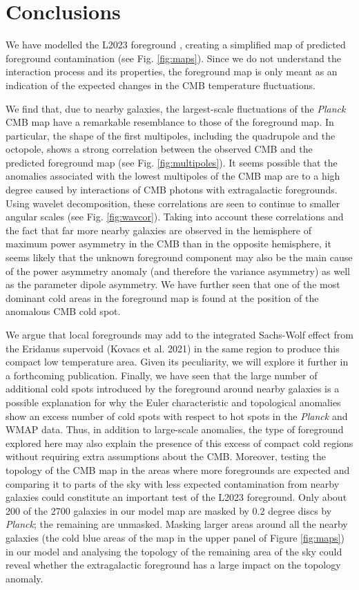 \documentclass{aa}
\begin{document}
\section{Conclusions}

We have modelled the L2023 foreground \citep{luparello}, creating a simplified map of predicted foreground contamination (see Fig. \ref{fig:maps}). Since we do not understand the interaction process and its properties, the foreground map is only meant as an indication of the expected changes in the CMB temperature fluctuations.

We find that, due to nearby galaxies, the largest-scale fluctuations of the \textit{Planck} CMB map have a remarkable resemblance to those of the foreground map. In particular, the shape of the first multipoles, including the quadrupole and the octopole, shows a strong correlation between the observed CMB and the predicted foreground map (see Fig. \ref{fig:multipoles}). It seems possible that the anomalies associated with the lowest multipoles of the CMB map are to a high degree caused by interactions of CMB photons with extragalactic foregrounds. Using wavelet decomposition, these correlations are seen to continue to smaller angular scales (see Fig. \ref{fig:wavcor}). Taking into account these correlations and the fact that far more nearby galaxies are observed in the hemisphere of maximum power asymmetry in the CMB than in the opposite hemisphere, it seems likely that the unknown foreground component may also be the main cause of the power asymmetry anomaly (and therefore the variance asymmetry) as well as the parameter dipole asymmetry. We have further seen that one of the most dominant cold areas in the foreground map is found at the position of the anomalous CMB cold spot.

We argue that local foregrounds may add to the integrated Sachs-Wolf effect from the Eridanus supervoid (Kovacs et al. 2021) in the same region to produce this compact low temperature area. Given its peculiarity, we will explore it further in a forthcoming publication. Finally, we have seen that the large number of additional cold spots introduced by the foreground around nearby galaxies is a possible explanation for why the Euler characteristic and topological anomalies show an excess number of cold spots with respect to hot spots in the \textit{Planck} and WMAP data. Thus, in addition to large-scale anomalies, the type of foreground explored here may also explain the presence of this excess of compact cold regions without requiring extra assumptions about the CMB. Moreover, testing the topology of the CMB map in the areas where more foregrounds are expected and comparing it to parts of the sky with less expected contamination from nearby galaxies could constitute an important test of the L2023 foreground. Only about 200 of the 2700 galaxies in our model map are masked by 0.2 degree discs by \textit{Planck}; the remaining are unmasked. Masking larger areas around all the nearby galaxies (the cold blue areas of the map in the upper panel of Figure \ref{fig:maps}) in our model and analysing the topology of the remaining area of the sky could reveal whether the extragalactic foreground has a large impact on the topology anomaly.
\end{document}
